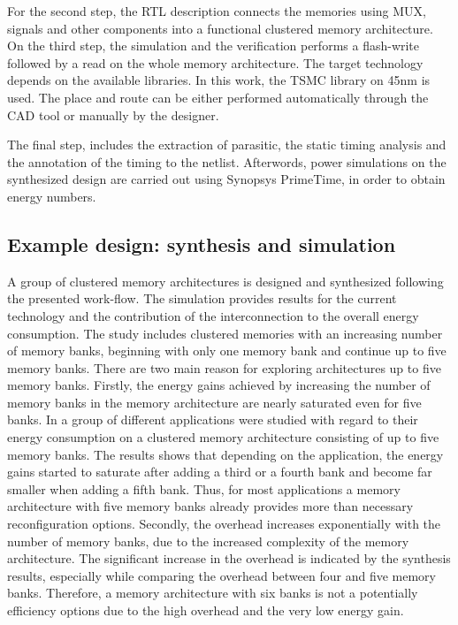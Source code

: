 For the second step, the RTL description connects the memories using MUX, signals and other components into a functional clustered memory architecture. 
On the third step, the simulation and the verification performs a flash-write followed by a read on the whole memory architecture. 
The target technology depends on the available libraries.
In this work, the TSMC library on 45nm is used.
The place and route can be either performed automatically through the CAD tool or manually by the designer.

The final step, includes the extraction of  parasitic, the static timing analysis and the annotation of the timing to the netlist.
Afterwords, power simulations on the synthesized design are carried out using Synopsys PrimeTime, in order to obtain energy numbers.

\subsection{Example design: synthesis and simulation}

A group of clustered memory architectures is designed and synthesized following the presented work-flow.
The simulation provides results for the current technology and the contribution of the interconnection to the overall energy consumption.
The study includes clustered memories with an increasing number of memory banks, beginning with only one memory bank and continue up to five memory banks.
There are two main reason for exploring architectures up to five memory banks.
Firstly, the energy gains achieved by increasing the number of memory banks in the memory architecture are nearly saturated even for five banks.
In \cite{filippopoulos2013exploration} a group of different applications were studied with regard to their energy consumption on a clustered memory architecture consisting of up to five memory banks.
The results shows that depending on the application, the energy gains started to saturate after adding a third or a fourth bank and become far smaller when adding a fifth bank.
Thus, for most applications a memory architecture with five memory banks already provides more than necessary reconfiguration options.  
Secondly, the overhead increases exponentially with the number of memory banks, due to the increased complexity of the memory architecture. 
The significant increase in the overhead is indicated by the synthesis results, especially while comparing the overhead between four and five memory banks.
Therefore, a memory architecture with six banks is not a potentially efficiency options due to the high overhead and the very low energy gain.


